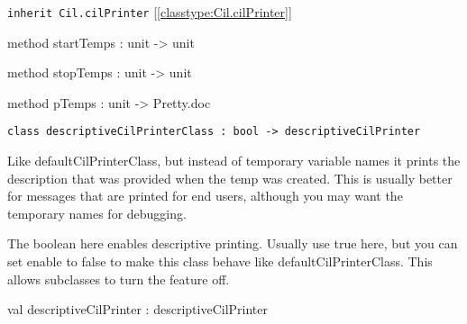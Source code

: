 \documentclass[11pt]{article}
\begin{document}
\begin{ocamldocobjectend}


{\tt{inherit Cil.cilPrinter}} [\ref{classtype:Cil.cilPrinter}]

\label{method:Cil.descriptiveCilPrinter.startTemps}\begin{ocamldoccode}
method startTemps : unit -> unit
\end{ocamldoccode}


\label{method:Cil.descriptiveCilPrinter.stopTemps}\begin{ocamldoccode}
method stopTemps : unit -> unit
\end{ocamldoccode}


\label{method:Cil.descriptiveCilPrinter.pTemps}\begin{ocamldoccode}
method pTemps : unit -> Pretty.doc
\end{ocamldoccode}
\end{ocamldocobjectend}






\begin{ocamldoccode}
{\tt{class descriptiveCilPrinterClass : }}{\tt{bool -> }}{\tt{descriptiveCilPrinter}}\end{ocamldoccode}
\label{class:Cil.descriptiveCilPrinterClass}



\begin{ocamldocdescription}
Like defaultCilPrinterClass, but instead of temporary variable
      names it prints the description that was provided when the temp was
      created.  This is usually better for messages that are printed for end
      users, although you may want the temporary names for debugging.


      The boolean here enables descriptive printing.  Usually use true
      here, but you can set enable to false to make this class behave
      like defaultCilPrinterClass. This allows subclasses to turn the
      feature off.


\end{ocamldocdescription}




\label{val:Cil.descriptiveCilPrinter}\begin{ocamldoccode}
val descriptiveCilPrinter : descriptiveCilPrinter
\end{ocamldoccode}
\end{document}
